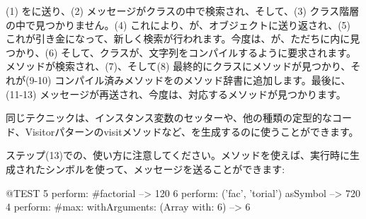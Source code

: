 \documentclass[a4paper,10pt,twoside]{book}
\begin{document}
(1) をに送り、(2) メッセージがクラスの中で検索され、そして、(3) クラス階層の中で見つかりません。(4) これにより、が、オブジェクトに送り返され、(5) これが引き金になって、新しく検索が行われます。今度は、が、ただちに内に見つかり、(6) そして、クラスが、文字列をコンパイルするように要求されます。メソッドが検索され、(7)、そして(8) 最終的にクラスにメソッドが見つかり、それが(9-10) コンパイル済みメソッドをのメソッド辞書に追加します。最後に、(11-13) メッセージが再送され、今度は、対応するメソッドが見つかります。%

同じテクニックは、インスタンス変数のセッターや、他の種類の定型的なコード、Visitorパターンのvisitメソッドなど、を生成するのに使うことができます。

ステップ(13)での、使い方に注意してください。メソッドを使えば、実行時に生成されたシンボルを使って、メッセージを送ることができます:
\begin{code}{@TEST}
5 perform: #factorial                                             --> 120
6 perform: ('fac', 'torial') asSymbol                       --> 720
4 perform: #max: withArguments: (Array with: 6) --> 6
\end{code}

\end{document}
